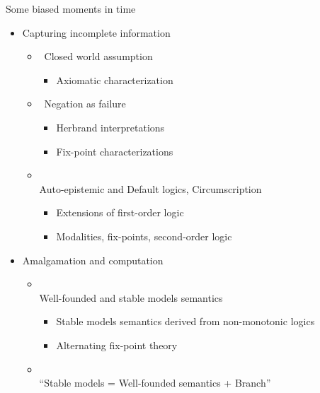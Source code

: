 \begin{frame}{Some biased moments in time}
  \begin{itemize}
  \item<1-> Capturing incomplete information
    \begin{itemize}
    \item<only@2->  \ Closed world assumption
      \begin{itemize}
      \item<only@3-5> Axiomatic characterization
      \end{itemize}
    \item<only@2->  \ Negation as failure
      \begin{itemize}
      \item<only@4-5> Herbrand interpretations
      \item<only@4-5> Fix-point characterizations
      \end{itemize}
    \item<only@2-> \\ Auto-epistemic and Default logics, Circumscription
      \begin{itemize}
      \item<only@5-5> Extensions of first-order logic
      \item<only@5-5> Modalities, fix-points, second-order logic
      \end{itemize}
    \end{itemize}
  \item<only@6-> Amalgamation and computation
    \begin{itemize}
    \item<only@7-> \\ Well-founded and stable models semantics
      \begin{itemize}
      \item<only@8-9> Stable models semantics derived from non-monotonic logics
      \item<only@8-9> Alternating fix-point theory
      \end{itemize}
    \item<only@7-> \\ ``Stable models = Well-founded semantics + Branch''

\end{itemize}
\end{itemize}
\end{frame}

